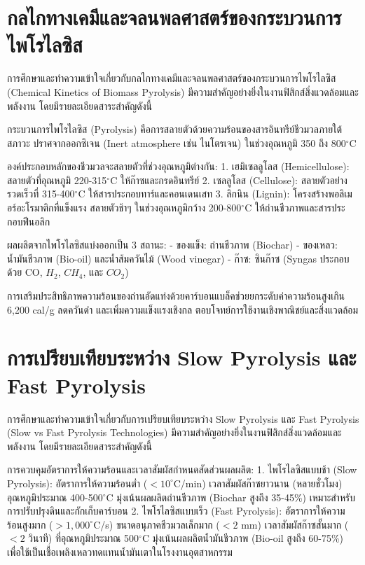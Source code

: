 
\section{กลไกทางเคมีและจลนพลศาสตร์ของกระบวนการไพโรไลซิส}

การศึกษาและทำความเข้าใจเกี่ยวกับกลไกทางเคมีและจลนพลศาสตร์ของกระบวนการไพโรไลซิส (Chemical Kinetics of Biomass Pyrolysis) มีความสำคัญอย่างยิ่งในงานฟิสิกส์สิ่งแวดล้อมและพลังงาน โดยมีรายละเอียดสาระสำคัญดังนี้

กระบวนการไพโรไลซิส (Pyrolysis) คือการสลายตัวด้วยความร้อนของสารอินทรีย์ชีวมวลภายใต้สภาวะ ปราศจากออกซิเจน (Inert atmosphere เช่น ไนโตรเจน) ในช่วงอุณหภูมิ 350 ถึง 800$^{\circ}$C

องค์ประกอบหลักของชีวมวลจะสลายตัวที่ช่วงอุณหภูมิต่างกัน:
1. เฮมิเซลลูโลส (Hemicellulose): สลายตัวที่อุณหภูมิ 220-315$^{\circ}$C ให้ก๊าซและกรดอินทรีย์
2. เซลลูโลส (Cellulose): สลายตัวอย่างรวดเร็วที่ 315-400$^{\circ}$C ให้สารประกอบทาร์และคอนเดนเสท
3. ลิกนิน (Lignin): โครงสร้างพอลิเมอร์อะโรมาติกที่แข็งแรง สลายตัวช้าๆ ในช่วงอุณหภูมิกว้าง 200-800$^{\circ}$C ให้ถ่านชีวภาพและสารประกอบฟีนอลิก

ผลผลิตจากไพโรไลซิสแบ่งออกเป็น 3 สถานะ:
- ของแข็ง: ถ่านชีวภาพ (Biochar)
- ของเหลว: น้ำมันชีวภาพ (Bio-oil) และน้ำส้มควันไม้ (Wood vinegar)
- ก๊าซ: ซินก๊าซ (Syngas ประกอบด้วย CO, $H_2$, $CH_4$, และ $CO_2$)

\begin{flamebox}
การเสริมประสิทธิภาพความร้อนของถ่านอัดแท่งด้วยคาร์บอนแบล็คช่วยยกระดับค่าความร้อนสูงเกิน 6,200 cal/g ลดควันดำ และเพิ่มความแข็งแรงเชิงกล ตอบโจทย์การใช้งานเชิงพาณิชย์และสิ่งแวดล้อม
\end{flamebox}

\section{การเปรียบเทียบระหว่าง Slow Pyrolysis และ Fast Pyrolysis}

การศึกษาและทำความเข้าใจเกี่ยวกับการเปรียบเทียบระหว่าง Slow Pyrolysis และ Fast Pyrolysis (Slow vs Fast Pyrolysis Technologies) มีความสำคัญอย่างยิ่งในงานฟิสิกส์สิ่งแวดล้อมและพลังงาน โดยมีรายละเอียดสาระสำคัญดังนี้

การควบคุมอัตราการให้ความร้อนและเวลาสัมผัสกำหนดสัดส่วนผลผลิต:
1. ไพโรไลซิสแบบช้า (Slow Pyrolysis): อัตราการให้ความร้อนต่ำ ($<10^{\circ}$C/min) เวลาสัมผัสก๊าซยาวนาน (หลายชั่วโมง) อุณหภูมิประมาณ 400-500$^{\circ}$C มุ่งเน้นผลผลิตถ่านชีวภาพ (Biochar สูงถึง 35-45\%) เหมาะสำหรับการปรับปรุงดินและกักเก็บคาร์บอน
2. ไพโรไลซิสแบบเร็ว (Fast Pyrolysis): อัตราการให้ความร้อนสูงมาก ($>1,000^{\circ}$C/s) ขนาดอนุภาคชีวมวลเล็กมาก ($<2$ mm) เวลาสัมผัสก๊าซสั้นมาก ($<2$ วินาที) ที่อุณหภูมิประมาณ 500$^{\circ}$C มุ่งเน้นผลผลิตน้ำมันชีวภาพ (Bio-oil สูงถึง 60-75\%) เพื่อใช้เป็นเชื้อเพลิงเหลวทดแทนน้ำมันเตาในโรงงานอุตสาหกรรม

